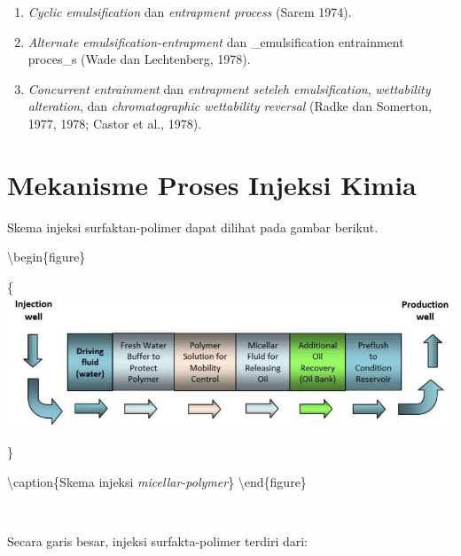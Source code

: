 \documentclass[
]{book}
\providecommand{\tightlist}{%
  \setlength{\itemsep}{0pt}\setlength{\parskip}{0pt}}
\begin{document}
\begin{enumerate}
\def\labelenumi{\alph{enumi}.}
\tightlist
\item
  \emph{Cyclic emulsification} dan \emph{entrapment process} (Sarem 1974).
\item
  \emph{Alternate emulsification-entrapment} dan \_emulsification entrainment proces\_s (Wade dan Lechtenberg, 1978).
\item
  \emph{Concurrent entrainment} dan \emph{entrapment seteleh emulsification}, \emph{wettability alteration}, dan \emph{chromatographic wettability reversal} (Radke dan Somerton, 1977, 1978; Castor et al., 1978).
\end{enumerate}

\hypertarget{mekanisme-proses-injeksi-kimia}{%
\section{Mekanisme Proses Injeksi Kimia}\label{mekanisme-proses-injeksi-kimia}}

Skema injeksi surfaktan-polimer dapat dilihat pada gambar berikut.

\textbackslash begin\{figure\}

\{\centering \includegraphics[width=0.5\linewidth]{images/chemical/skema}

\}

\textbackslash caption\{Skema injeksi \emph{micellar-polymer}\}\label{fig:unnamed-chunk-54}
\textbackslash end\{figure\}

~

Secara garis besar, injeksi surfakta-polimer terdiri dari:
\end{document}
